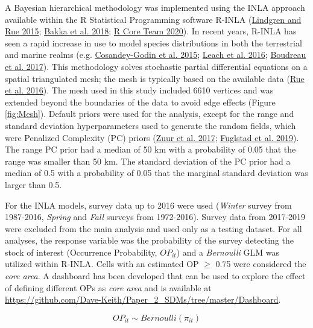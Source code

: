 \documentclass[
]{article}
\begin{document}
A Bayesian hierarchical methodology was implemented using the INLA approach available within the R Statistical Programming software R-INLA (\protect\hyperlink{ref-lindgrenBayesianSpatialModelling2015}{Lindgren and Rue 2015}; \protect\hyperlink{ref-bakkaSpatialModellingRINLA2018}{Bakka et al. 2018}; \protect\hyperlink{ref-rcoreteamLanguageEnvironmentStatistical2020}{R Core Team 2020}). In recent years, R-INLA has seen a rapid increase in use to model species distributions in both the terrestrial and marine realms (e.g. \protect\hyperlink{ref-cosandey-godinApplyingBayesianSpatiotemporal2015}{Cosandey-Godin et al. 2015}; \protect\hyperlink{ref-leachModellingInfluenceBiotic2016}{Leach et al. 2016}; \protect\hyperlink{ref-boudreauConnectivityPersistenceLoss2017}{Boudreau et al. 2017}). This methodology solves stochastic partial differential equations on a spatial triangulated mesh; the mesh is typically based on the available data (\protect\hyperlink{ref-rueBayesianComputingINLA2016}{Rue et al. 2016}). The mesh used in this study included 6610 vertices and was extended beyond the boundaries of the data to avoid edge effects (Figure \ref{fig:Mesh}). Default priors were used for the analysis, except for the range and standard deviation hyperparameters used to generate the random fields, which were Penalized Complexity (PC) priors (\protect\hyperlink{ref-zuurBeginnerGuideSpatial2017}{Zuur et al. 2017}; \protect\hyperlink{ref-fuglstadConstructingPriorsThat2019}{Fuglstad et al. 2019}). The range PC prior had a median of 50 km with a probability of 0.05 that the range was smaller than 50 km. The standard deviation of the PC prior had a median of 0.5 with a probability of 0.05 that the marginal standard deviation was larger than 0.5.

For the INLA models, survey data up to 2016 were used (\emph{Winter} survey from 1987-2016, \emph{Spring} and \emph{Fall} surveys from 1972-2016). Survey data from 2017-2019 were excluded from the main analysis and used only as a testing dataset. For all analyses, the response variable was the probability of the survey detecting the stock of interest (Occurrence Probability, \(OP_{it}\)) and a \emph{Bernoulli} GLM was utilized within R-INLA. Cells with an estimated OP \(\geq\) 0.75 were considered the \emph{core area}. A dashboard has been developed that can be used to explore the effect of defining different OPs as \emph{core area} and is available at \url{https://github.com/Dave-Keith/Paper_2_SDMs/tree/master/Dashboard}.

\[ OP_{it} \sim Bernoulli(\pi_{it}) \]
\end{document}
